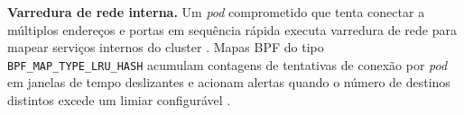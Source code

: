 \textbf{Varredura de rede interna.}
Um \textit{pod} comprometido que tenta conectar a múltiplos endereços e portas
em sequência rápida executa varredura de rede para mapear serviços internos do
cluster \cite{cassagnes2020}.
Mapas BPF do tipo \texttt{BPF\_MAP\_TYPE\_LRU\_HASH} acumulam contagens de
tentativas de conexão por \textit{pod} em janelas de tempo deslizantes e acionam
alertas quando o número de destinos distintos excede um limiar configurável
\cite{linuxkernel2024,gregg2020}.